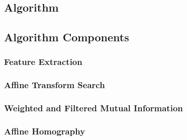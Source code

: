 \documentclass[11pt]{report}
\begin{document}
\begin{doublespace}
\indent






\chapter{Algorithm}

\indent



\section{Algorithm Components}

\indent



\subsection{Feature Extraction}

\indent


\subsection{Affine Transform Search}

\indent



\subsection{Weighted and Filtered Mutual Information}

\indent



\subsection{Affine Homography}

\indent




\end{doublespace}
\end{document}
